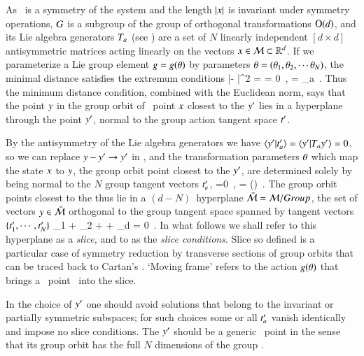 As \Group\ is a symmetry of the system and the length $|x|$ is
invariant under symmetry operations, $G$ is a subgroup of
the group of orthogonal transformations $\textrm{O}(d)$, and its Lie algebra
{generators} $T_a$ (see ) are a set of $N$ linearly independent
$[d\!\times\!d]$ antisymmetric matrices acting linearly on the {\statesp}
vectors $x \in {\cal M} \subset \mathbb{R}^d$.
If we parameterize a Lie group element $g=g({\bf \theta})$ by
parameters ${\bf \theta} = ({\bf \theta}_1,{\bf \theta}_2,\cdots{\bf \theta}_N)$, the minimal
distance satisfies the extremum conditions
\beq
{} |\ssp - \LieEl\slicep|^2
   =
   = 0
    \,,\qquad
	   = \Lg_a \slicep
\,.
\label{PCsectQ}
\eeq
Thus the minimum distance condition, combined with the Euclidean norm, says
that the point $y$ in the group orbit of \statesp\ point $x$
closest to the {\template} ${y'}$ lies in a hyperplane
through the point ${y'}$, normal to the group action tangent space
$t'_{}$.

By the antisymmetry of the Lie algebra generators we have
$\braket{\slicep}{\sliceTan{a}} = \braket{\slicep}{\Lg_{a}\slicep}=0$, so
we can replace $y - {y'} \to {\ensuremath{y'}}$ in , and
the transformation parameters ${\bf \theta}$ which map the state $x$ to
$y$, the group orbit point
closest to the {\template} ${y'}$, are determined solely by being
normal to the $N$ group tangent vectors $t'_{a}$,
\beq
{} =0
    \,,\qquad
\sspRed = \LieEl(\gSpace) \ssp
\,.
The group orbit points closest to the {\template} thus lie in a $(d\!-\!N)$\dmn\ hyperplane $\bar{\cal M} = {\cal M}/Group$, the set of vectors $y \in  \bar{\cal M}$ orthogonal to the group tangent space spanned by tangent vectors
$\{t'_{1},\cdots,t'_{N}\}$
\beq
\sspRed_1 + \sspRed_2
  + \cdots + \sspRed_d = 0
\,.
In what follows we shall refer to this hyperplane as a
\emph{slice,} and to   as the \emph{slice conditions}.
Slice so defined is a particular case of symmetry reduction
by transverse sections of group
orbits that can be traced back to
Cartan's \mframes{}. `Moving frame' refers to the action 
$g({\bf \theta})$ that 
brings a \statesp\ point \ssp\ into the slice.

In the choice of ${y'}$ one should avoid solutions that belong to the
invariant or partially symmetric subspaces; for such choices some or all
$t'_{a}$ vanish identically and impose no slice conditions. The {\template}
${y'}$ should be a generic \statesp\ point in the sense that its group
orbit has the full $N$ dimensions of the group \Group.

